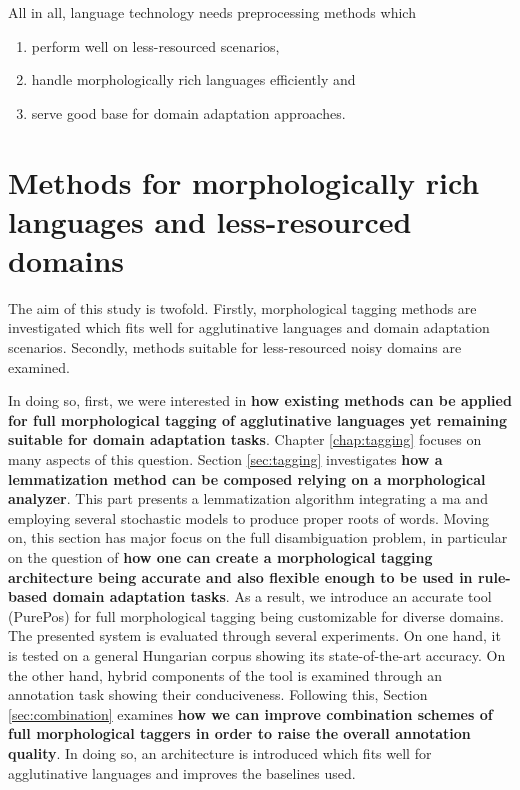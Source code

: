 All in all, language technology needs preprocessing methods which
\begin{enumerate}
\item perform well on less-resourced scenarios,
\item handle morphologically rich languages efficiently and
\item serve good base for domain adaptation approaches.
\end{enumerate}

\section{Methods for morphologically rich languages and less-resourced domains}

The aim of this study is twofold. 
Firstly, morphological tagging methods are investigated which fits well for agglutinative languages and domain adaptation scenarios. 
Secondly, methods suitable for less-resourced noisy domains are examined.

In doing so, first, we were interested in \textbf{how existing methods can be applied for full morphological tagging of agglutinative languages yet remaining suitable for domain adaptation tasks}. 
Chapter \ref{chap:tagging} focuses on many aspects of this question. 
Section \ref{sec:tagging} investigates \textbf{how a lemmatization method can be composed relying on a morphological analyzer}. 
This part presents a lemmatization algorithm integrating a \acrshort{ma} and employing several stochastic models to produce proper roots of words.
Moving on, this section has major focus on the full disambiguation problem, in particular on the question of \textbf{how one can create a morphological tagging architecture being accurate and also flexible enough to be used in rule-based domain adaptation tasks}.
As a result, we introduce an accurate tool (PurePos) for full morphological tagging being customizable for diverse domains.
The presented system is evaluated through several experiments. 
On one hand, it is tested on a general Hungarian corpus showing its state-of-the-art accuracy.
On the other hand, hybrid components of the tool is examined through an annotation task showing their conduciveness.
Following this, Section \ref{sec:combination} examines \textbf{how we can improve combination schemes of full morphological taggers in order to raise the overall annotation quality}.
In doing so, an architecture is introduced which fits well for agglutinative languages and improves the baselines used.



